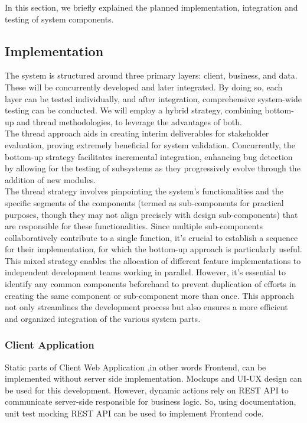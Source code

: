 In this section, we briefly explained the planned implementation, integration and testing of system components. 

\subsection{Implementation}
\indent The system is structured around three primary layers: client, business, and data. These will be concurrently developed and later integrated. By doing so, each layer can be tested individually, and after integration, comprehensive system-wide testing can be conducted. We will employ a hybrid strategy, combining bottom-up and thread methodologies, to leverage the advantages of both.
\\
\indent The thread approach aids in creating interim deliverables for stakeholder evaluation, proving extremely beneficial for system validation. Concurrently, the bottom-up strategy facilitates incremental integration, enhancing bug detection by allowing for the testing of subsystems as they progressively evolve through the addition of new modules.
\\
\indent The thread strategy involves pinpointing the system's functionalities and the specific segments of the components (termed as sub-components for practical purposes, though they may not align precisely with design sub-components) that are responsible for these functionalities. Since multiple sub-components collaboratively contribute to a single function, it's crucial to establish a sequence for their implementation, for which the bottom-up approach is particularly useful.
\\
\indent This mixed strategy enables the allocation of different feature implementations to independent development teams working in parallel. However, it's essential to identify any common components beforehand to prevent duplication of efforts in creating the same component or sub-component more than once. This approach not only streamlines the development process but also ensures a more efficient and organized integration of the various system parts.

\subsubsection{Client Application}
Static parts of Client Web Application ,in other words Frontend, can be implemented without server side implementation. Mockups and UI-UX design can be used for this development. However, dynamic actions rely on REST API to communicate server-side responsible for business logic. So, using documentation, unit test mocking REST API can be used to implement Frontend code.
